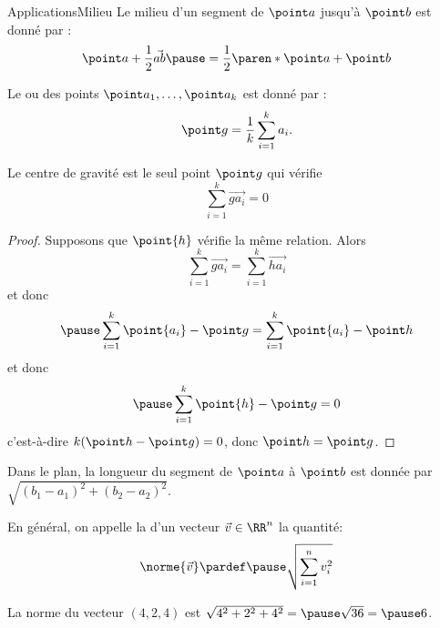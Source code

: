 \documentclass[french,xcolor=svgnames]{beamer}
\begin{document}
\begin{frame}{Applications}{Milieu}
  Le milieu d'un segment\pause{} de $\point a$ jusqu'à $\point b$\pause{} est donné par :\pause{}
  \begin{equation*}
    \point a + \frac 12 \vec{ab}\pause = \frac 12 \paren*{\point a + \point b}
  \end{equation*}\pause
  
  Le \pause{} ou \pause{} des points $\point a_1, \ldots, \point a_k$ est donné par \pause{}:
  \begin{equation*}
    \point g = \frac 1k \sum_{i=1}^{k} a_i.
  \end{equation*}\pause{}
  \begin{proposition}
    Le centre de gravité est le seul point $\point g$ qui vérifie\pause{}
    \begin{equation*}
      \sum_{i=1}^{k} \vec{ga_i} = 0
    \end{equation*}
  \end{proposition}
\end{frame}
\begin{frame}
  \begin{proof}%
    Supposons que $\point {h}$ vérifie la même relation.\pause{} Alors
    \begin{equation*}
      \sum_{i=1}^{k} \vec{ga_i} =       \sum_{i=1}^{k} \vec{ha_i}
    \end{equation*}\pause{}
    et donc
    \begin{equation*}\pause
      \sum_{i=1}^{k} \point{a_i} - \point g = \sum_{i=1}^{k} \point{a_i} - \point h
    \end{equation*}\pause{}
    et donc
    \begin{equation*}\pause
      \sum_{i=1}^{k} \point{h} - \point g = 0
    \end{equation*}\pause{}
    c'est-à-dire $k(\point h - \point g) = 0$, donc $\point h = \point g$.
  \end{proof}
\end{frame}
\begin{frame}
  \begin{proposition}
  Dans le plan, la longueur du segment de $\point a$ à $\point b$\pause{} est donnée par $\sqrt{(b_1-a_1)^{2} + (b_2-a_2)^{2}}$.\pause{}
\end{proposition}

  \begin{definition}
    En général, on appelle la  d'un vecteur $\vec v\in\RR^{n}$ la quantité:\pause{}
    \begin{equation*}
      \norme {\vec v} \pardef\pause \sqrt{\sum_{i=1}^{n} v_i^{2}}
    \end{equation*}
  \end{definition}
  \begin{example}\pause{}
    La norme du vecteur $(4,2,4)$ est\pause{} $\sqrt{4^{2} + 2^{2} + 4^{2}} =\pause \sqrt{36}=\pause 6$.
  \end{example}
\end{frame}
\end{document}
